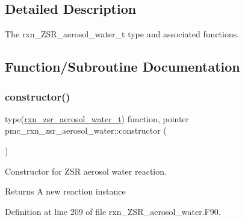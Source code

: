 \subsection{Detailed Description}
The rxn\+\_\+\+Z\+S\+R\+\_\+aerosol\+\_\+water\+\_\+t type and associated functions. 

\subsection{Function/\+Subroutine Documentation}
\mbox{\label{namespacepmc__rxn__zsr__aerosol__water_a3ceff195484eeb2afb745aeb4ab31ddb}} 
\subsubsection{\texorpdfstring{constructor()}{constructor()}}
{\footnotesize\ttfamily type(\mbox{\hyperlink{structpmc__rxn__zsr__aerosol__water_1_1rxn__zsr__aerosol__water__t}{rxn\+\_\+zsr\+\_\+aerosol\+\_\+water\+\_\+t}}) function, pointer pmc\+\_\+rxn\+\_\+zsr\+\_\+aerosol\+\_\+water\+::constructor (\begin{DoxyParamCaption}{ }\end{DoxyParamCaption})\hspace{0.3cm}{\ttfamily [private]}}



Constructor for Z\+SR aerosol water reaction. 

\begin{DoxyReturn}{Returns}
A new reaction instance 
\end{DoxyReturn}


Definition at line 209 of file rxn\+\_\+\+Z\+S\+R\+\_\+aerosol\+\_\+water.\+F90.

\mbox{\label{namespacepmc__rxn__zsr__aerosol__water_ad28f0d91114d117e54d04c9b3cbe21dc}} 
